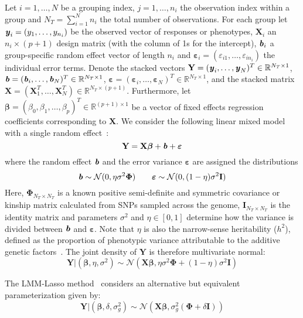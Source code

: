 \documentclass[10pt,letterpaper]{article}
\newcommand{\by}{\textbf{\emph{y}}}
\newcommand{\bX}{\textbf{X}}
\newcommand{\bY}{\textbf{Y}}
\newcommand{\bb}{\textbf{\emph{b}}}
\newcommand{\bI}{\textbf{I}}
\newcommand{\be}{\boldsymbol{\varepsilon}}
\newcommand{\bbeta}{\boldsymbol{\beta}}
\newcommand{\bPhi}{\boldsymbol{\Phi}}
\begin{document}
Let $i = 1, \ldots, N$ be a grouping index, $j = 1, \ldots, n_i$ the observation index within a group and $N_T = \sum_{i=1}^{N} n_i$ the total number of observations. For each group let \mbox{$\by_i = (y_1, \ldots, y_{n_i})$} be the observed vector of responses or phenotypes, $\bX_i$ an $n_i \times (p + 1)$ design matrix (with the column of 1s for the intercept), $\bb_i$ a group-specific random effect vector of length $n_i$ and \mbox{$\be_i = (\varepsilon_{i1}, \ldots, \varepsilon_{in_i})$} the individual error terms. Denote the stacked vectors $\bY = (\by_i, \ldots, \by_N)^T \in \mathbb{R}^{N_T \times 1}$, $\bb = (\bb_i, \ldots, \bb_N)^T \in \mathbb{R}^{N_T \times 1}$, \mbox{$\be = (\be_i, \ldots, \be_N)^T \in \mathbb{R}^{N_T \times 1}$}, and the stacked matrix \\\mbox{$\bX = (\bX_1^T, \ldots, \bX_N^T) \in \mathbb{R}^{N_T \times (p + 1)}$}. Furthermore, let $\bbeta = (\beta_0,\beta_1, \ldots, \beta_p)^T \in \mathbb{R}^{(p+1) \times 1}$ be a vector of fixed effects regression coefficients corresponding to $\bX$. We consider the following linear mixed model with a single random effect~\cite{pirinen2013efficient}:
\begin{equation}
\bY = \bX \bbeta + \bb + \be
\end{equation}
where the random effect $\bb$ and the error variance $\be$ are assigned the distributions
\begin{equation}
\bb \sim \mathcal{N}(0, \eta \sigma^2 \bPhi) \qquad \be \sim \mathcal{N}(0, (1-\eta)\sigma^2 \bI)
\end{equation}
Here, $\bPhi_{N_T \times N_T}$ is a known positive semi-definite and symmetric covariance or kinship matrix calculated from SNPs sampled across the genome,   $\bI_{N_T \times N_T}$ is the identity matrix and parameters $\sigma^2$ and $\eta \in [0,1]$ determine how the variance is divided between $\bb$ and $\be$. Note that $\eta$ is also the narrow-sense heritability ($h^2$), defined as the proportion of phenotypic variance attributable to the additive genetic factors~\cite{manolio2009finding}. The joint density of $\bY$ is therefore multivariate normal:
\begin{equation}
\bY | (\bbeta, \eta, \sigma^2) \sim \mathcal{N}(\bX \bbeta, \eta \sigma^2 \bPhi + (1-\eta)\sigma^2 \bI) \label{eq:prinen}
\end{equation}

The LMM-Lasso method~\cite{rakitsch2013lasso} considers an alternative but equivalent parameterization given by:
\begin{equation}
\bY | (\bbeta, \delta, \sigma_g^2) \sim \mathcal{N}(\bX \bbeta, \sigma_g^2(\bPhi + \delta\bI)) \label{eq:lippert}
\end{equation}
\end{document}
